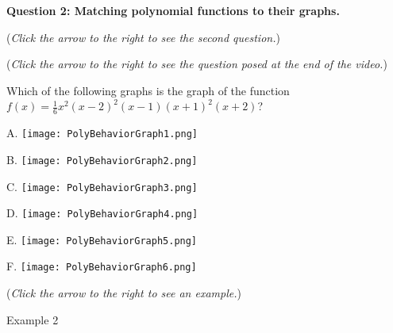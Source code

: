 \documentclass{ximera}
\begin{document}
\textbf{Question 2: Matching polynomial functions to their graphs.}
\begin{question}
\begin{flushright}
{\color{blue}(\emph{Click the arrow to the right to see the second question.})}
\end{flushright}
\begin{center}
\begin{expandable}
\begin{flushright}
{\color{blue}(\emph{Click the arrow to the right to see the  question
posed at the end of the video.})}
\end{flushright}
\begin{expandable}
Which of the following graphs is the graph of the function $f(x) = \frac{1}{6}x^2(x-2)^2(x-1)(x+1)^2(x+2)$?
\begin{multicols}{3}
\begin{center}
A. \texttt{[image: PolyBehaviorGraph1.png]}
\end{center}

\begin{center}
B. \texttt{[image: PolyBehaviorGraph2.png]}
\end{center}
 
\begin{center}
C. \texttt{[image: PolyBehaviorGraph3.png]}
\end{center}
\end{multicols}

\begin{multicols}{3}
\begin{center}
D. \texttt{[image: PolyBehaviorGraph4.png]}
\end{center}

\begin{center}
E. \texttt{[image: PolyBehaviorGraph5.png]} %
\end{center}

\begin{center}
F. \texttt{[image: PolyBehaviorGraph6.png]}
\end{center}
\end{multicols}

\begin{multipleChoice}
\end{multipleChoice}
\begin{flushright}
{\color{blue}(\emph{Click the arrow to the right to see an example.})}
\end{flushright}
\begin{expandable}
Example 2
\end{expandable}
\end{expandable}
\end{expandable}
\end{center}
\end{question}
\end{document}

